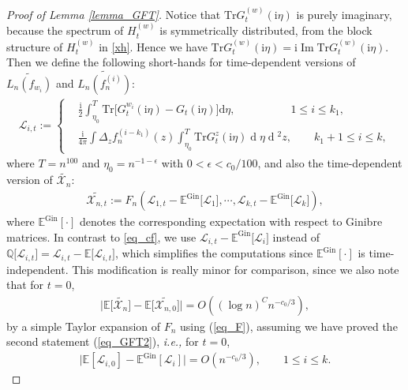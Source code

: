 \documentclass[10pt,reqno]{amsart}
\numberwithin{equation}{section}
\numberwithin{figure}{section}
\theoremstyle{plain}
\newcommand{\ii}{\mathrm{i}}
\newcommand{\wt}{\widetilde}
\newcommand{\<}{\langle}
\renewcommand{\>}{\rangle}
\newcommand{\E}{\mathbb{E}}
\newcommand{\dd}{\operatorname{d}\!{}}
\newcommand{\ie}{\emph{i.e., }}
\renewcommand{\Im}{\operatorname{Im}}
\begin{document}
\begin{proof}[Proof of Lemma \ref{lemma_GFT}]
	
	
	
	
	Notice that $\mathrm{Tr} G_t^{(w)}(\ii \eta)$ is purely imaginary, because the spectrum of $H_t^{(w)}$ is symmetrically distributed, from the block structure of $H_t^{(w)}$ in \eqref{xh}. Hence we have $\mathrm{Tr} G_t^{(w)}(\ii \eta)=\ii\Im \mathrm{Tr} G_t^{(w)}(\ii \eta)$. Then we define the following short-hands for time-dependent versions of $\wt{L_n(f_{w_i})}$ and $\wt{L_n(f^{(i)}_n)}$:
	\begin{align}\label{eq_LL}
		\mathcal{L}_{i,t}:=\begin{cases}
			&%
		\frac{\ii}{2}\int_{\eta_0}^{T}  \mathrm{Tr} \big[ G_t^{w_i}(\ii \eta)-G_t(\ii \eta)\big] \mathrm{d} \eta, \quad\qquad\qquad 1\leq i\leq k_1, \\
		&%
		\frac{\ii}{4\pi} \int \Delta_z f^{(i-k_1)}_n(z) \int_{\eta_0}^{T} \mathrm{Tr} G^z_t(\ii \eta) \dd \eta \dd^2 z,  \qquad k_1+1\leq i\leq k,
		\end{cases}
	\end{align}
	where $T=n^{100}$ and $\eta_0=n^{-1-\epsilon}$ with $0<\epsilon<c_0/100$, and also the time-dependent version of $\wt{\mathcal{X}_n}$:  
    \begin{align}\label{eq_XXX}
    \wt{\mathcal{X}_{n,t}}:=F_n\left(\mathcal{L}_{1,t}-\E^{\mathrm{Gin}}\big[\mathcal{L}_{1}\big],\cdots,\mathcal{L}_{k,t}-\E^{\mathrm{Gin}}\big[ \mathcal{L}_{k}\big] \right),
    \end{align}
    where $\E^{\mathrm{Gin}}[\cdot]$ denotes the corresponding  expectation with respect to Ginibre matrices. In contrast to \eqref{eq_cf}, we use $\mathcal{L}_{i,t}-\E^{\mathrm{Gin}}\big[\mathcal{L}_{i}\big]$ instead of $\mathbb{Q}\big[\mathcal{L}_{i,t}\big]=\mathcal{L}_{i,t}-\E\big[\mathcal{L}_{i,t}\big]$, which simplifies  the computations since $\E^{\mathrm{Gin}}[\cdot]$ is  time-independent. This modification is really minor for comparison, since we also note that for $t=0$,
    \begin{align}\label{eq_minor}
    \Big|\E \big[\wt{\mathcal{X}_{n}}\big]- \E \big[\wt{\mathcal{X}_{n,0}}\big]\Big|=O((\log n)^C n^{-c_0/3}),
    \end{align}
    by a simple Taylor expansion of $F_n$ using (\ref{eq_F}), assuming we have proved the second statement (\ref{eq_GFT2}), \ie for $t=0$, 
	 \begin{align}\label{eq_goal1}
	 	\Big| \E [\mathcal{L}_{i,0}]-\E^{\mathrm{Gin}} [\mathcal{L}_{i}]\Big|=O(n^{-c_0/3}), \qquad 1\leq i\leq k.
	 \end{align}
 

\end{proof}
\end{document}
